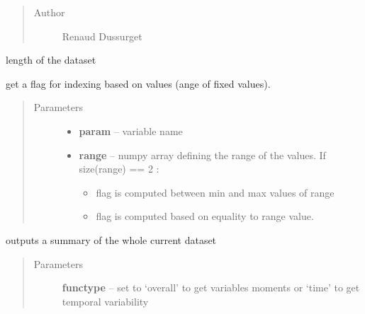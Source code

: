 \documentclass[letterpaper,10pt,english]{sphinxmanual}
\begin{document}
\begin{fulllineitems}
\begin{fulllineitems}
\begin{quote}
\begin{description}
\item[{Author }] \leavevmode
Renaud Dussurget

\end{description}\end{quote}

\end{fulllineitems}


\begin{fulllineitems}
\label{altimetry.data:altimetry.data.hydro_data.size}
length of the dataset

\end{fulllineitems}


\begin{fulllineitems}
\label{altimetry.data:altimetry.data.hydro_data.slice}
get a flag for indexing based on values (ange of fixed values).
\begin{quote}\begin{description}
\item[{Parameters}] \leavevmode\begin{itemize}
\item {} 
\textbf{param} -- variable name

\item {} 
\textbf{range} -- 
numpy array defining the range of the values. If size(range) == 2 :
\begin{itemize}
\item {} 
flag is computed between min and max values of range

\item {} 
flag is computed based on equality to range value.

\end{itemize}


\end{itemize}

\end{description}\end{quote}

\end{fulllineitems}


\begin{fulllineitems}
\label{altimetry.data:altimetry.data.hydro_data.summary}
outputs a summary of the whole current dataset
\begin{quote}\begin{description}
\item[{Parameters}] \leavevmode
\textbf{functype} -- set to `overall' to get variables moments or `time' to get temporal variability


\end{description}
\end{quote}
\end{fulllineitems}
\end{fulllineitems}
\end{document}
